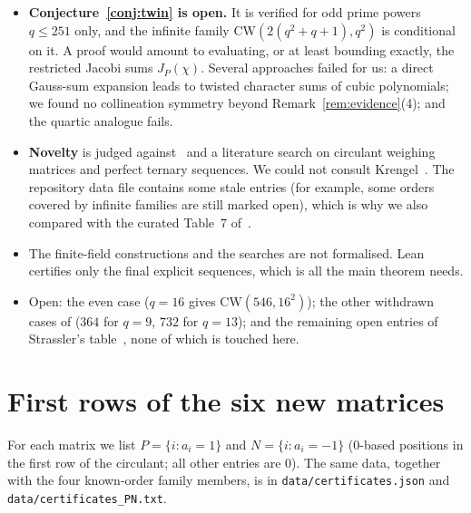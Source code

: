 \documentclass[11pt]{article}
\numberwithin{equation}{section}
\theoremstyle{definition}
\theoremstyle{remark}
\newcommand{\CW}{\mathrm{CW}}
\begin{document}
\begin{itemize}
\item \textbf{Conjecture~\ref{conj:twin} is open.} It is verified for odd prime powers $q\le251$
only, and the infinite family $\CW(2(q^2+q+1),q^2)$ is conditional on it. A proof would amount to
evaluating, or at least bounding exactly, the restricted Jacobi sums $J_P(\chi)$. Several
approaches failed for us: a direct Gauss-sum expansion leads to twisted character sums of cubic
polynomials; we found no collineation symmetry beyond Remark~\ref{rem:evidence}(4); and the
quartic analogue fails.
\item \textbf{Novelty} is judged against~\cite{GordonRepo,G26,AGZ,Tan26} and a literature search
on circulant weighing matrices and perfect ternary sequences. We could not consult
Krengel~\cite{Kr04}. The repository data file contains some stale entries (for example, some
orders covered by infinite families are still marked open), which is why we also compared with the
curated Table~7 of~\cite{G26}.
\item The finite-field constructions and the searches are not formalised. Lean certifies only the
final explicit sequences, which is all the main theorem needs.
\item Open: the even case ($q=16$ gives $\CW(546,16^2)$); the other withdrawn cases of
\cite[Theorem~6.6]{AGZ} ($364$ for $q=9$, $732$ for $q=13$); and the remaining open entries of
Strassler's table~\cite{AGZ,Tan26}, none of which is touched here.
\end{itemize}

\appendix
\section{First rows of the six new matrices}\label{app:data}

For each matrix we list $P=\{i:a_i=1\}$ and $N=\{i:a_i=-1\}$ (0-based positions in the first row
of the circulant; all other entries are $0$). The same data, together with the four
known-order family members, is in \texttt{data/certificates.json} and
\texttt{data/certificates\_PN.txt}.


\end{document}

